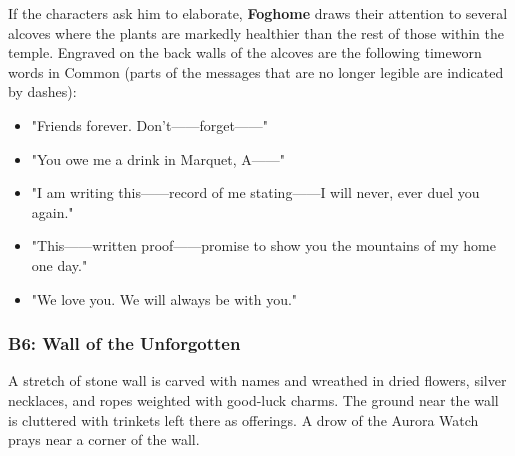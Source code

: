 \documentclass[10pt,a4,twoside,twocolumn,openany,nodeprecatedcode]{dndbook}
\begin{document}
If the characters ask him to elaborate, \textbf{Foghome} draws their attention to several alcoves where the plants are markedly healthier than the rest of those within the temple. Engraved on the back walls of the alcoves are the following timeworn words in Common (parts of the messages that are no longer legible are indicated by dashes):
\begin{itemize}

\item "Friends forever. Don't——forget——"
\item "You owe me a drink in Marquet, A——"
\item "I am writing this——record of me stating——I will never, ever duel you again."
\item "This——written proof——promise to show you the mountains of my home one day."
\item "We love you. We will always be with you."
\end{itemize}


\subsubsection{B6: Wall of the Unforgotten}
\begin{DndReadAloud}{}
A stretch of stone wall is carved with names and wreathed in dried flowers, silver necklaces, and ropes weighted with good-luck charms. The ground near the wall is cluttered with trinkets left there as offerings. A drow of the Aurora Watch prays near a corner of the wall.
\end{DndReadAloud}
\end{document}
